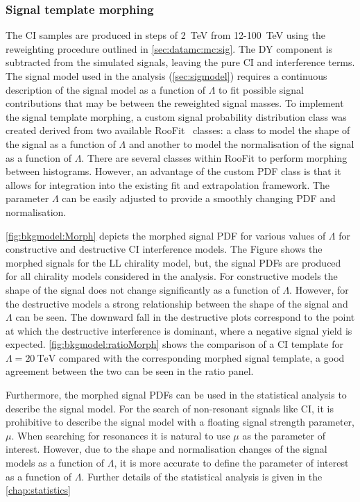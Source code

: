 \subsubsection{Signal template morphing}\label{sec:datamc:mc:sig:morphing}
The CI samples are produced in steps of \SI{2}{\tera\electronvolt} from 12-\SI{100} {\tera\electronvolt} using the reweighting procedure outlined in \cref{sec:datamc:mc:sig}. The DY component is subtracted from the simulated signals, leaving the pure CI and interference terms. The signal model used in the analysis (\cref{sec:sigmodel}) requires a continuous description of the signal model as a function of $\Lambda$ to fit possible signal contributions that may be between the reweighted signal masses. To implement the signal template morphing, a custom signal probability distribution class was created derived from two available RooFit~\cite{RooFit} classes: a class to model the shape of the signal as a function of $\Lambda$ and another to model the normalisation of the signal as a function of $\Lambda$. There are several classes within RooFit to perform morphing between histograms. However, an advantage of the custom PDF class is that it allows for integration into the existing fit and extrapolation framework. The parameter $\Lambda$ can be easily adjusted to provide a smoothly changing PDF and normalisation. 

\cref{fig:bkgmodel:Morph} depicts the morphed signal PDF for various values of $\Lambda$ for constructive and destructive CI interference models. The Figure shows the morphed signals for the LL chirality model, but, the signal PDFs are produced for all chirality models considered in the analysis. For constructive models the shape of the signal does not change significantly as a function of $\Lambda$. However, for the destructive models a strong relationship between the shape of the signal and $\Lambda$ can be seen. The downward fall in the destructive plots correspond to the point at which the destructive interference is dominant, where a negative signal yield is expected. \cref{fig:bkgmodel:ratioMorph} shows the comparison of a CI template for $\Lambda = \SI{20}{\tera\electronvolt}$ compared with the corresponding morphed signal template, a good agreement between the two can be seen in the ratio panel. 

Furthermore, the morphed signal PDFs can be used in the statistical analysis to describe the signal model. For the search of non-resonant signals like CI, it is prohibitive to describe the signal model with a floating signal strength parameter, $\mu$. When searching for resonances it is natural to use $\mu$ as the parameter of interest. However, due to the shape and normalisation changes of the signal models as a function of $\Lambda$, it is more accurate to define the parameter of interest as a function of $\Lambda$. Further details of the statistical analysis is given in the \cref{chap:statistics}

